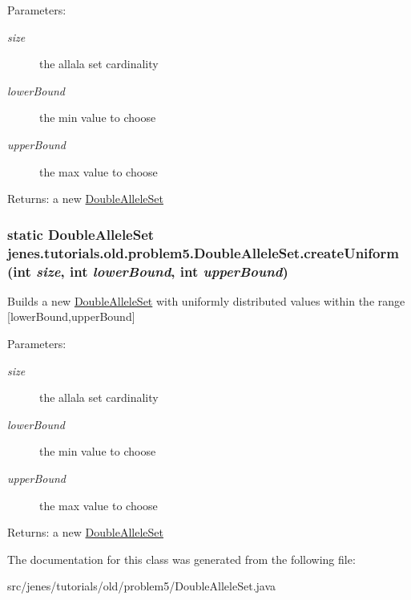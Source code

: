 \begin{Desc}
\item[Parameters:]
\begin{description}
\item[{\em size}]the allala set cardinality \item[{\em lowerBound}]the min value to choose \item[{\em upperBound}]the max value to choose \end{description}
\end{Desc}
\begin{Desc}
\item[Returns:]a new \hyperlink{classjenes_1_1tutorials_1_1old_1_1problem5_1_1_double_allele_set}{DoubleAlleleSet} \end{Desc}
\hypertarget{classjenes_1_1tutorials_1_1old_1_1problem5_1_1_double_allele_set_f442b73be0657db17a35d7fb376a98ed}{
\subsubsection[createUniform]{\setlength{\rightskip}{0pt plus 5cm}static {\bf DoubleAlleleSet} jenes.tutorials.old.problem5.DoubleAlleleSet.createUniform (int {\em size}, \/  int {\em lowerBound}, \/  int {\em upperBound})}}
\label{classjenes_1_1tutorials_1_1old_1_1problem5_1_1_double_allele_set_f442b73be0657db17a35d7fb376a98ed}


Builds a new \hyperlink{classjenes_1_1tutorials_1_1old_1_1problem5_1_1_double_allele_set}{DoubleAlleleSet} with uniformly distributed values within the range \mbox{[}lowerBound,upperBound\mbox{]} 

\begin{Desc}
\item[Parameters:]
\begin{description}
\item[{\em size}]the allala set cardinality \item[{\em lowerBound}]the min value to choose \item[{\em upperBound}]the max value to choose \end{description}
\end{Desc}
\begin{Desc}
\item[Returns:]a new \hyperlink{classjenes_1_1tutorials_1_1old_1_1problem5_1_1_double_allele_set}{DoubleAlleleSet} \end{Desc}


The documentation for this class was generated from the following file:\begin{CompactItemize}
\item 
src/jenes/tutorials/old/problem5/DoubleAlleleSet.java\end{CompactItemize}
